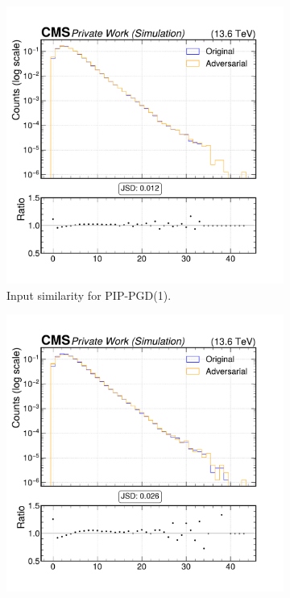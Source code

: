\begin{figure}[htbp]
  \centering
  \begin{subfigure}[t]{0.32\textwidth}
    \includegraphics[width=\linewidth]{media/output/features/compare/combined_it_1/cmp_global_features_n_Npfcand.pdf}
    \caption*{Input similarity for PIP-PGD(1).}
  \end{subfigure}\hfill
  \begin{subfigure}[t]{0.32\textwidth}
    \includegraphics[width=\linewidth]{media/output/features/compare/combined_it_2/cmp_global_features_n_Npfcand.pdf}

\end{subfigure}
\end{figure}
